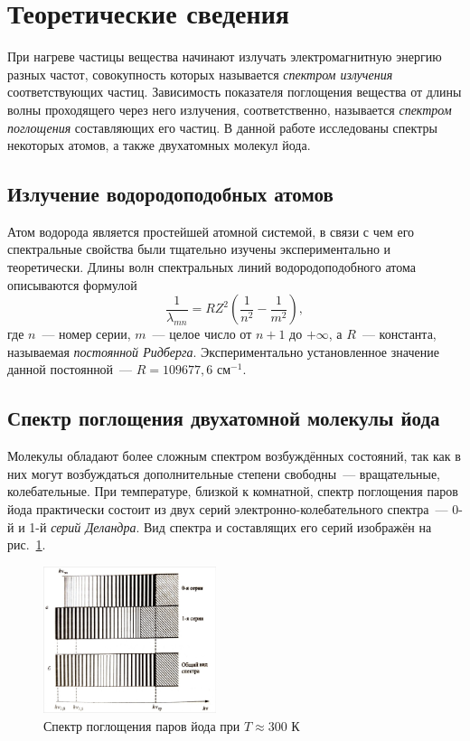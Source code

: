 \section{Теоретические сведения}
При нагреве частицы вещества начинают излучать электромагнитную энергию разных частот, совокупность которых называется \textit{спектром излучения} соответствующих частиц. Зависимость показателя поглощения вещества от длины волны проходящего через него излучения, соответственно, называется \textit{спектром поглощения} составляющих его частиц. В данной работе исследованы спектры некоторых атомов, а также двухатомных молекул йода.

\subsection{Излучение водородоподобных атомов}
Атом водорода является простейшей атомной системой, в связи с чем его спектральные свойства были тщательно изучены экспериментально и теоретически. Длины волн спектральных линий водородоподобного атома описываются формулой
\begin{equation}\label{hydrogen}
    \frac{1}{\lambda_{mn}} = RZ^2\left(\frac{1}{n^2} - \frac{1}{m^2}\right),
\end{equation}
где $n$~--- номер серии, $m$~--- целое число от $n+1$ до $+\infty$, а $R$~--- константа, называемая \textit{постоянной Ридберга}. Экспериментально установленное значение данной постоянной~--- $R = 109677,6$ см$^{-1}$.

\subsection{Спектр поглощения двухатомной молекулы йода}
Молекулы обладают более сложным спектром возбуждённых состояний, так как в них могут возбуждаться дополнительные степени свободны~--- вращательные, колебательные. При температуре, близкой к комнатной, спектр поглощения паров йода практически состоит из двух серий электронно-колебательного спектра~--- 0-й и 1-й \textit{серий Деландра}. Вид спектра и составлящих его серий изображён на рис.~\ref{fig:spectrum}.
\begin{figure}[h]
    \centering
    \includegraphics[width=0.45\textwidth]{img/spectrum.jpg}
    \caption{Спектр поглощения паров йода при $T\approx 300$ К}
    \label{fig:spectrum}
\end{figure}

